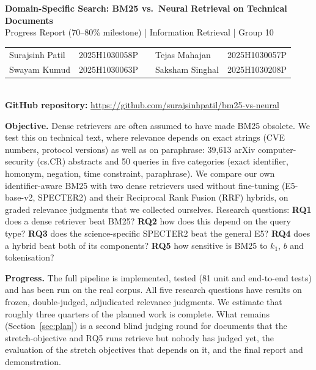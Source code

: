 \documentclass[10pt,a4paper]{article}
\newcommand{\repo}{\url{https://github.com/surajsinhpatil/bm25-vs-neural}}
\begin{document}
\begin{center}
{\Large\bfseries Domain-Specific Search: BM25 vs.\ Neural Retrieval on Technical Documents}\\[3pt]
{\large Progress Report (70--80\% milestone) \;|\; Information Retrieval \;|\; Group 10}\\[5pt]
\begin{tabular}{@{}llcll@{}}
Surajsinh Patil & 2025H1030058P & \hspace{2em} & Tejas Mahajan & 2025H1030057P\\
Swayam Kumud & 2025H1030063P & & Saksham Singhal & 2025H1030208P
\end{tabular}\\[4pt]
\textbf{GitHub repository:} \repo
\end{center}

\textbf{Objective.} Dense retrievers are often assumed to have made BM25 obsolete. We test this on technical
text, where relevance depends on exact strings (CVE numbers, protocol versions) as well as on paraphrase:
39{,}613 arXiv computer-security (cs.CR) abstracts and 50 queries in five categories (exact identifier,
homonym, negation, time constraint, paraphrase). We compare our own identifier-aware BM25 with two dense
retrievers used without fine-tuning (E5-base-v2, SPECTER2) and their Reciprocal Rank Fusion (RRF) hybrids,
on graded relevance judgments that we collected ourselves. Research questions: \textbf{RQ1} does a dense
retriever beat BM25? \textbf{RQ2} how does this depend on the query type? \textbf{RQ3} does the
science-specific SPECTER2 beat the general E5? \textbf{RQ4} does a hybrid beat both of its components?
\textbf{RQ5} how sensitive is BM25 to $k_1$, $b$ and tokenisation?

\textbf{Progress.} The full pipeline is implemented, tested (81 unit and end-to-end tests) and has been run on
the real corpus. All five research questions have results on frozen, double-judged, adjudicated relevance
judgments. We estimate that roughly three quarters of the planned work is complete. What remains
(Section~\ref{sec:plan}) is a second blind judging round for documents that the stretch-objective and RQ5 runs
retrieve but nobody has judged yet, the evaluation of the stretch objectives that depends on it, and the
final report and demonstration.
\end{document}
